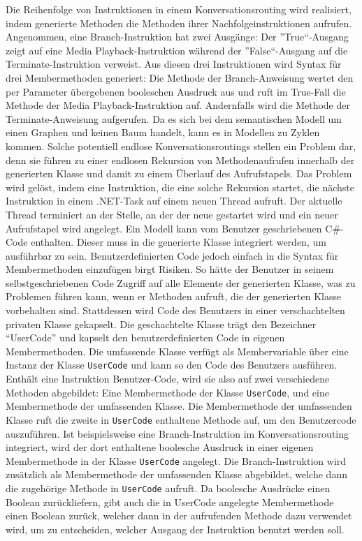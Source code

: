 Die Reihenfolge von Instruktionen in einem Konversationsrouting wird realisiert, indem generierte Methoden die Methoden ihrer Nachfolgeinstruktionen aufrufen. Angenommen, eine Branch-Instruktion hat zwei Ausgänge: Der ''True``-Ausgang zeigt auf eine Media Playback-Instruktion während der ''False``-Ausgang auf die Terminate-Instruktion verweist. Aus diesen drei Instruktionen wird Syntax für drei Membermethoden generiert: Die Methode der Branch-Anweisung wertet den per Parameter übergebenen booleschen Ausdruck aus und ruft im True-Fall die Methode der Media Playback-Instruktion auf. Andernfalls wird die Methode der Terminate-Anweisung aufgerufen. Da es sich bei dem semantischen Modell um einen Graphen und keinen Baum handelt, kann es in Modellen zu Zyklen kommen. Solche potentiell endlose Konversationsroutings stellen ein Problem dar, denn sie führen zu einer endlosen Rekursion von Methodenaufrufen innerhalb der generierten Klasse und damit zu einem Überlauf des Aufrufstapels. Das Problem wird gelöst, indem eine Instruktion, die eine solche Rekursion startet, die nächste Instruktion in einem .NET-Task auf einem neuen Thread aufruft. Der aktuelle Thread terminiert an der Stelle, an der der neue gestartet wird und ein neuer Aufrufstapel wird angelegt.
\newline
Ein Modell kann vom Benutzer geschriebenen C\#-Code enthalten. Dieser muss in die generierte Klasse integriert werden, um ausführbar zu sein. Benutzerdefinierten Code jedoch einfach in die Syntax für Membermethoden einzufügen birgt Risiken. So hätte der Benutzer in seinem selbstgeschriebenen Code Zugriff auf alle Elemente der generierten Klasse, was zu Problemen führen kann, wenn er Methoden aufruft, die der generierten Klasse vorbehalten sind. Stattdessen wird Code des Benutzers in einer verschachtelten privaten Klasse gekapselt. Die geschachtelte Klasse trägt den Bezeichner ``UserCode'' und kapselt den benutzerdefinierten Code in eigenen Membermethoden. Die umfassende Klasse verfügt als Membervariable über eine Instanz der Klasse \texttt{UserCode} und kann so den Code des Benutzers ausführen.  Enthält eine Instruktion Benutzer-Code, wird sie also auf zwei verschiedene Methoden abgebildet: Eine Membermethode der Klasse \texttt{UserCode}, und eine Membermethode der umfassenden Klasse. Die Membermethode der umfassenden Klasse ruft die zweite in \texttt{UserCode} enthaltene Methode auf, um den Benutzercode auszuführen. Ist beispielsweise eine Branch-Instruktion im Konversationsrouting integriert, wird der dort enthaltene boolesche Ausdruck in einer eigenen Membermethode in der Klasse \texttt{UserCode} angelegt. Die Branch-Instruktion wird zusätzlich als Membermethode der umfassenden Klasse abgebildet, welche dann die zugehörige Methode in \texttt{UserCode} aufruft. Da boolesche Ausdrücke einen Boolean zurückliefern, gibt auch die in UserCode angelegte Membermethode einen Boolean zurück, welcher dann in der aufrufenden Methode dazu verwendet wird, um zu entscheiden, welcher Ausgang der Instruktion benutzt werden soll.
